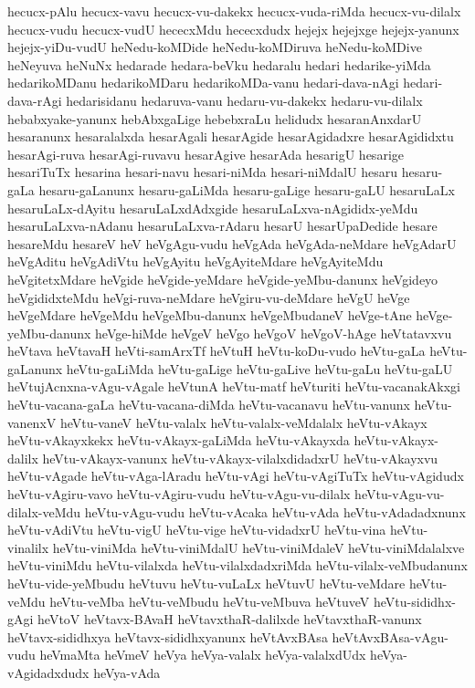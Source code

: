 {hecucx-pAlu
hecucx-vavu
hecucx-vu-dakekx
hecucx-vuda-riMda
hecucx-vu-dilalx
hecucx-vudu
hecucx-vudU
hececxMdu
hececxdudx
hejejx
hejejxge
hejejx-yanunx
hejejx-yiDu-vudU
heNedu-koMDide
heNedu-koMDiruva
heNedu-koMDive
heNeyuva
heNuNx
hedarade
hedara-beVku
hedaralu
hedari
hedarike-yiMda
hedarikoMDanu
hedarikoMDaru
hedarikoMDa-vanu
hedari-dava-nAgi
hedari-dava-rAgi
hedarisidanu
hedaruva-vanu
hedaru-vu-dakekx
hedaru-vu-dilalx
hebabxyake-yanunx
hebAbxgaLige
hebebxraLu
helidudx
hesaranAnxdarU
hesaranunx
hesaralalxda
hesarAgali
hesarAgide
hesarAgidadxre
hesarAgididxtu
hesarAgi-ruva
hesarAgi-ruvavu
hesarAgive
hesarAda
hesarigU
hesarige
hesariTuTx
hesarina
hesari-navu
hesari-niMda
hesari-niMdalU
hesaru
hesaru-gaLa
hesaru-gaLanunx
hesaru-gaLiMda
hesaru-gaLige
hesaru-gaLU
hesaruLaLx
hesaruLaLx-dAyitu
hesaruLaLxdAdxgide
hesaruLaLxva-nAgididx-yeMdu
hesaruLaLxva-nAdanu
hesaruLaLxva-rAdaru
hesarU
hesarUpaDedide
hesare
hesareMdu
hesareV
heV
heVgAgu-vudu
heVgAda
heVgAda-neMdare
heVgAdarU
heVgAditu
heVgAdiVtu
heVgAyitu
heVgAyiteMdare
heVgAyiteMdu
heVgitetxMdare
heVgide
heVgide-yeMdare
heVgide-yeMbu-danunx
heVgideyo
heVgididxteMdu
heVgi-ruva-neMdare
heVgiru-vu-deMdare
heVgU
heVge
heVgeMdare
heVgeMdu
heVgeMbu-danunx
heVgeMbudaneV
heVge-tAne
heVge-yeMbu-danunx
heVge-hiMde
heVgeV
heVgo
heVgoV
heVgoV-hAge
heVtatavxvu
heVtava
heVtavaH
heVti-samArxTf
heVtuH
heVtu-koDu-vudo
heVtu-gaLa
heVtu-gaLanunx
heVtu-gaLiMda
heVtu-gaLige
heVtu-gaLive
heVtu-gaLu
heVtu-gaLU
heVtujAcnxna-vAgu-vAgale
heVtunA
heVtu-matf
heVturiti
heVtu-vacanakAkxgi
heVtu-vacana-gaLa
heVtu-vacana-diMda
heVtu-vacanavu
heVtu-vanunx
heVtu-vanenxV
heVtu-vaneV
heVtu-valalx
heVtu-valalx-veMdalalx
heVtu-vAkayx
heVtu-vAkayxkekx
heVtu-vAkayx-gaLiMda
heVtu-vAkayxda
heVtu-vAkayx-dalilx
heVtu-vAkayx-vanunx
heVtu-vAkayx-vilalxdidadxrU
heVtu-vAkayxvu
heVtu-vAgade
heVtu-vAga-lAradu
heVtu-vAgi
heVtu-vAgiTuTx
heVtu-vAgidudx
heVtu-vAgiru-vavo
heVtu-vAgiru-vudu
heVtu-vAgu-vu-dilalx
heVtu-vAgu-vu-dilalx-veMdu
heVtu-vAgu-vudu
heVtu-vAcaka
heVtu-vAda
heVtu-vAdadadxnunx
heVtu-vAdiVtu
heVtu-vigU
heVtu-vige
heVtu-vidadxrU
heVtu-vina
heVtu-vinalilx
heVtu-viniMda
heVtu-viniMdalU
heVtu-viniMdaleV
heVtu-viniMdalalxve
heVtu-viniMdu
heVtu-vilalxda
heVtu-vilalxdadxriMda
heVtu-vilalx-veMbudanunx
heVtu-vide-yeMbudu
heVtuvu
heVtu-vuLaLx
heVtuvU
heVtu-veMdare
heVtu-veMdu
heVtu-veMba
heVtu-veMbudu
heVtu-veMbuva
heVtuveV
heVtu-sididhx-gAgi
heVtoV
heVtavx-BAvaH
heVtavxthaR-dalilxde
heVtavxthaR-vanunx
heVtavx-sididhxya
heVtavx-sididhxyanunx
heVtAvxBAsa
heVtAvxBAsa-vAgu-vudu
heVmaMta
heVmeV
heVya
heVya-valalx
heVya-valalxdUdx
heVya-vAgidadxdudx
heVya-vAda
}
